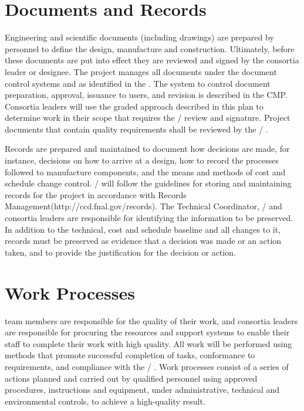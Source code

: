 \section{Documents and Records}

Engineering and scientific documents (including drawings) are prepared
by  personnel to define the design, manufacture and
construction. Ultimately, before these documents are put into effect
they are reviewed and signed by the  consortia leader or
designee. The  project manages all documents under
the document control systems  and \docdb as identified in the 
.  The system to control document preparation, approval,
issuance to users, and revision is described in the CMP. Consortia
leaders will use the graded approach described in this plan to
determine work in their scope that requires the
/  review and signature. Project
documents that contain quality requirements shall be reviewed by the
/ .

Records are prepared and maintained to document how decisions are
made, for instance, decisions on how to arrive at a design, how to
record the processes followed to manufacture components, and the means
and methods of cost and schedule change control. / will follow
the guidelines for storing and maintaining records for the project in
accordance with \fnal Records
Management(http://ccd.fnal.gov/records). The  Technical Coordinator,
/  and consortia leaders are responsible for
identifying the information to be preserved. In addition to the
technical, cost and schedule baseline and all changes to it, records
must be preserved as evidence that a decision was made or an action
taken, and to provide the justification for the decision or action.

\section{Work Processes}

 team members are responsible for the quality of their work, and
consortia leaders are responsible for procuring the resources and
support systems to enable their staff to complete their work with high
quality. All  work will be performed using methods that promote
successful completion of tasks, conformance to  requirements, and
compliance with the / . Work processes
consist of a series of actions planned and carried out by qualified
personnel using approved procedures, instructions and equipment, under
administrative, technical and environmental controls, to achieve a
high-quality result.

